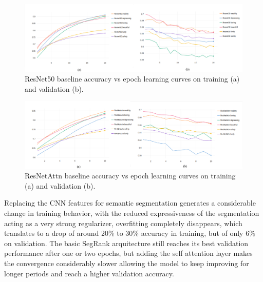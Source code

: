\begin{figure}[ht]
	\begin{center}
	\includegraphics[width=1\textwidth]{./figures/resnet50_graph.png}
	\caption[ResNet Training curves]{
        ResNet50 baseline accuracy vs epoch learning curves on training (a) and validation (b).
        }
	\label{fig:resnet_graph}
	\end{center}
\end{figure}

\begin{figure}[ht]
	\begin{center}
	\includegraphics[width=1\textwidth]{./figures/resnet_attn_graph.png}
	\caption[ResNetAttn Training curves]{
        ResNetAttn baseline accuracy vs epoch learning curves on training (a) and validation (b).
        }
	\label{fig:resnet_attn_graph}
	\end{center}
\end{figure}

Replacing the CNN features for semantic segmentation generates a considerable change in training
behavior, with the reduced expressiveness of the segmentation acting as a very strong regularizer,
overfitting completely disappears, which translates to a drop of around 20\% to 30\% accuracy in training,
but of only 6\% on validation. The basic SegRank arquitecture still reaches its best validation
performance after one or two epochs, but adding the self attention layer makes the convergence
considerably slower allowing the model to keep improving for longer periods and reach a higher
validation accuracy.


